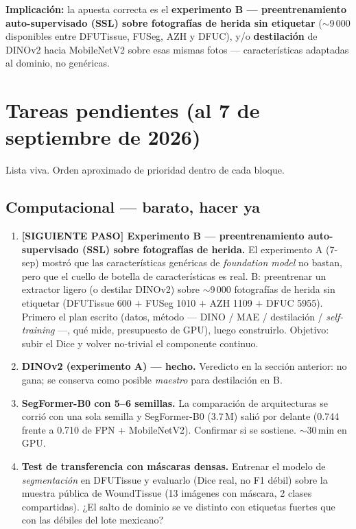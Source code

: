 \documentclass[12pt,letterpaper]{report}
\begin{document}
\textbf{Implicación:} la apuesta correcta es el \textbf{experimento B --- preentrenamiento
auto-supervisado (SSL) sobre fotografías de herida sin etiquetar} ($\sim$9\,000 disponibles entre
DFUTissue, FUSeg, AZH y DFUC), y/o \textbf{destilación} de DINOv2 hacia MobileNetV2 sobre esas mismas
fotos --- características adaptadas al dominio, no genéricas.

\section{Tareas pendientes (al 7 de septiembre de 2026)}

Lista viva. Orden aproximado de prioridad dentro de cada bloque.

\subsection*{Computacional --- barato, hacer ya}

\begin{enumerate}[leftmargin=1.6em]
    \item \textbf{[SIGUIENTE PASO] Experimento B --- preentrenamiento auto-supervisado (SSL) sobre
        fotografías de herida.} El experimento A (7-sep) mostró que las características genéricas de
        \emph{foundation model} no bastan, pero que el cuello de botella de características es real.
        B: preentrenar un extractor ligero (o destilar DINOv2) sobre $\sim$9\,000 fotografías de
        herida sin etiquetar (DFUTissue 600 $+$ FUSeg 1010 $+$ AZH 1109 $+$ DFUC 5955). Primero
        el plan escrito (datos, método --- DINO / MAE / destilación / \emph{self-training} ---, qué
        mide, presupuesto de GPU), luego construirlo. Objetivo: subir el Dice y volver no-trivial el
        componente continuo.
    \item \textbf{DINOv2 (experimento A) --- hecho.} Veredicto en la sección anterior: no gana; se
        conserva como posible \emph{maestro} para destilación en B.
    \item \textbf{SegFormer-B0 con 5--6 semillas.} La comparación de arquitecturas se corrió con una
        sola semilla y SegFormer-B0 (3.7\,M) salió por delante (0.744 frente a 0.710 de FPN +
        MobileNetV2). Confirmar si se sostiene. $\sim$30\,min en GPU.
    \item \textbf{Test de transferencia con máscaras densas.} Entrenar el modelo de \emph{segmentación}
        en DFUTissue y evaluarlo (Dice real, no F1 débil) sobre la muestra pública de WoundTissue
        (13 imágenes con máscara, 2 clases compartidas). ¿El salto de dominio se ve distinto con
        etiquetas fuertes que con las débiles del lote mexicano?
\end{enumerate}
\end{document}
